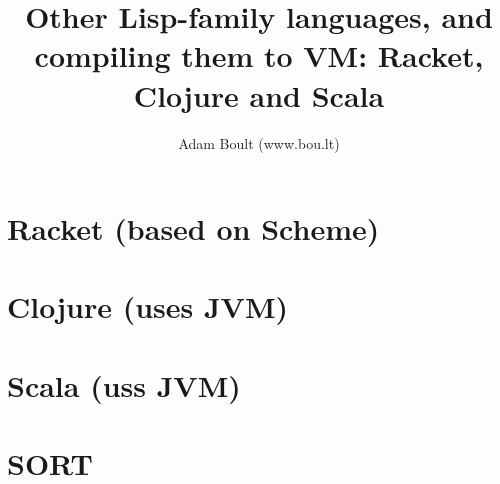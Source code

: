 \documentclass[oneside]{book}
\begin{document}
\author{Adam Boult (www.bou.lt)}
\title{Other Lisp-family languages, and compiling them to VM: Racket, Clojure and Scala}
\maketitle

\setcounter{tocdepth}{0}
\tableofcontents



\part{Racket (based on Scheme)}

\part{Clojure (uses JVM)}

\part{Scala (uss JVM)}

\part{SORT}

\end{document}
